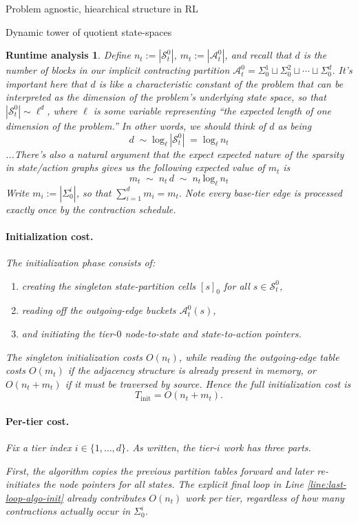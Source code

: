 \documentclass[11pt]{article}
\newtheorem{run_analysis}[subsubsection]{Runtime analysis}
\begin{document}
\begin{section}{Problem agnostic, hiearchical structure in RL}
\begin{subsection}{Dynamic tower of quotient state-spaces}
\begin{run_analysis}
Define
$
n_t:=|\mathcal{S}_t^0|$,
$
m_t:=|\mathcal{A}_t^0|$, and recall that $d$ is the number of blocks in our implicit contracting partition
$\mathcal{A}_t^0
=
\Sigma_0^1 \sqcup \Sigma_0^2 \sqcup \cdots \sqcup \Sigma_0^d
$.
It's important here that $d$ is like a characteristic constant of the problem that can be interpreted as the dimension of the problem's underlying state space, so that $|\mathcal{S}_t^0|\sim \ell^{d}$, where $\ell$ is some variable representing ``the expected length of one dimension of the problem.'' In other words, we should think of $d$ as being
\begin{equation}\label{eq: approx log}
d\;\sim\;\text{log}_{\ell}\,|\mathcal{S}_t^0|\;=\;\text{log}_{\ell}\,n_{t}
\end{equation}
...There's also a natural argument that the expect expected nature of the sparsity in state/action graphs gives us the following expected value of $m_{t}$ is
$$
m_{t}
\;\sim\;
n_{t}\,d
\;\sim\;
n_{t}\,\text{log}_{\ell}\,n_{t}
$$
Write
$
m_i:=|\Sigma_0^i|$, so that $\sum_{i=1}^d m_i=m_t.
$
Note every base-tier edge is processed exactly once by the contraction schedule.

\paragraph{Initialization cost.}
The initialization phase consists of:
\begin{enumerate}
    \item creating the singleton state-partition cells $[s]_0$ for all $s\in\mathcal{S}_t^0$,
    \item reading off the outgoing-edge buckets $\mathcal{A}_t^0(s)$,
    \item and initiating the tier-$0$ node-to-state and state-to-action pointers.
\end{enumerate}
The singleton initialization costs $O(n_t)$, while reading the outgoing-edge table costs $O(m_t)$ if the adjacency structure is already present in memory, or $O(n_t+m_t)$ if it must be traversed by source. Hence the full initialization cost is
\[
T_{\mathrm{init}}=O(n_t+m_t).
\]

\paragraph{Per-tier cost.}
Fix a tier index $i\in\{1,\dots,d\}$. As written, the tier-$i$ work has three parts.

First, the algorithm copies the previous partition tables forward and later re-initiates the node pointers for all states. The explicit final loop in Line \ref{line:last-loop-algo-init} already contributes $O(n_t)$ work per tier, regardless of how many contractions actually occur in $\Sigma_0^i$.


\end{run_analysis}
\end{subsection}
\end{section}
\end{document}
